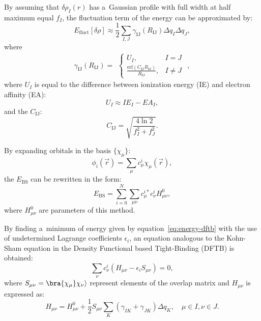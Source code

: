 By assuming that $\delta \rho_I(r)$ has a~Gaussian profile with full width at half maximum equal $f_I$, the fluctuation term of the energy can be approximated by:
\begin{equation}
    E_{\text{fluct}}[\delta \rho] \approx \frac{1}{2} \sum_{I, J} \gamma_{\text{IJ}}(R_{\text{IJ}}) \Delta q_I \Delta q_J,
\end{equation}
where
\begin{equation}
    \gamma_{\text{IJ}}(R_{\text{IJ}}) = 
    \begin{aligned}
    \begin{cases}
        U_I, &I = J \\
        \frac{\text{erf}(C_{\text{IJ}} R_{\text{IJ}})}{R_{\text{IJ}}}, &I \neq J
    \end{cases}
    \end{aligned},
\end{equation}
where $U_I$ is equal to the difference between ionization energy (IE) and electron affinity (EA):
\begin{equation}
    U_I \approx IE_I - EA_I,
\end{equation}
and the $C_{\text{IJ}}$:
\begin{equation}
    C_{\text{IJ}} = \sqrt{\frac{4 \ln{2}}{f_I^2 + f_J^2}}.
\end{equation}

By expanding orbitals in the basis $\{ \chi_{\mu} \}$:
\begin{equation}
    \phi_i (\vec{r}) = \sum_{\mu} c_{\mu}^i \chi_{\mu}(\vec{r}),
\end{equation}
the $E_{\text{BS}}$ can be rewritten in the form:
\begin{equation}
    E_{\text{BS}} = \sum_{i = 0}^N \sum_{\mu \nu} c_{\mu}^{i*} c_{\nu}^i H^{0}_{\mu \nu},
\end{equation}
where $H^{0}_{\mu \nu}$ are parameters of this method.

By finding a~minimum of energy given by equation~\ref{eq:energy-dftb} with the use of undetermined Lagrange coefficients $\epsilon_i$, an equation analogous to the Kohn-Sham equation in the Density Functional based Tight-Binding (DFTB) is obtained:
\begin{equation}
    \sum_{\nu} c_{\nu}^i \left(H_{\mu \nu} - \epsilon_i S_{\mu \nu} \right) = 0,
    \label{eq:ks-dftb}
\end{equation}
where $S_{\mu \nu} = \bra{\chi_{\mu}} \chi_{\nu} \rangle$ represent elements of the overlap matrix and $H_{\mu \nu}$ is expressed as:
\begin{equation}
    H_{\mu \nu} = H^{0}_{\mu \nu} + \frac{1}{2} S_{\mu \nu} \sum_K \left(\gamma_{IK} + \gamma_{JK}\right) \Delta q_K, \quad \mu \in I, \nu \in J.
    \label{eq:dftb-hmunu}
\end{equation}

